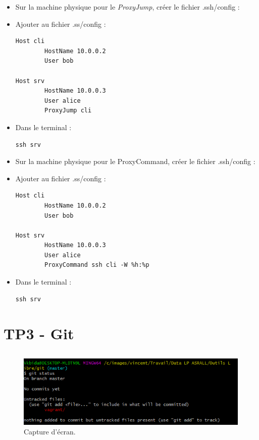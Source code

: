 \documentclass{article}
\begin{document}
\begin{itemize}
\item Sur la machine physique pour le \emph{ProxyJump}, créer le fichier .ssh/config :
\item Ajouter au fichier .ss/config :
\begin{lstlisting}
Host cli
        HostName 10.0.0.2
        User bob

Host srv
        HostName 10.0.0.3
        User alice
        ProxyJump cli
\end{lstlisting}
\item Dans le terminal :
\begin{lstlisting}
ssh srv
\end{lstlisting}
\item Sur la machine physique pour le ProxyCommand, créer le fichier .ssh/config :
\item Ajouter au fichier .ss/config :
\begin{lstlisting}
Host cli
        HostName 10.0.0.2
        User bob

Host srv
        HostName 10.0.0.3
        User alice
        ProxyCommand ssh cli -W %h:%p
\end{lstlisting}
\item Dans le terminal :
\begin{lstlisting}
ssh srv
\end{lstlisting}
\end{itemize}

\section{TP3 - Git}

\subsection{}

\begin{figure}[h]
\centering
\includegraphics[width=\textwidth]{images/q3-1-1.png}
\caption{\label{fig:frog}Capture d'écran.}
\end{figure}
\end{document}
